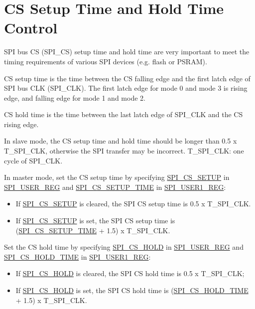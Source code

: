 \documentclass[main\_\_EN.tex]{subfiles}
\begin{document}
\section{CS Setup Time and Hold Time Control}\label{sec:spi-cs-setup-hold-time-ctrl}

SPI bus CS (SPI\_CS) setup time and hold time are very important to meet the timing requirements of various SPI devices (e.g. flash or PSRAM).

CS setup time is the time between the CS falling edge and the first latch edge of SPI bus CLK (SPI\_CLK). The first latch edge for mode 0 and mode 3 is rising edge, and falling edge for mode 1 and mode 2.

CS hold time is the time between the last latch edge of SPI\_CLK and the CS rising edge.

In slave mode, the CS setup time and hold time should be longer than 0.5 x T\_SPI\_CLK, otherwise the SPI transfer may be incorrect. T\_SPI\_CLK: one cycle of SPI\_CLK.

In master mode, set the CS setup time by specifying \hyperref[fielddesc:SPICSSETUP]{SPI\_CS\_SETUP} in \hyperref[regdesc:SPIUSERREG]{SPI\_USER\_REG} and  \hyperref[fielddesc:SPICSSETUPTIME]{SPI\_CS\_SETUP\_TIME} in \hyperref[regdesc:SPIUSER1REG]{SPI\_USER1\_REG}:
    \begin{itemize}
        \item If \hyperref[fielddesc:SPICSSETUP]{SPI\_CS\_SETUP} is cleared, the SPI CS setup time is 0.5 x T\_SPI\_CLK.
        \item If \hyperref[fielddesc:SPICSSETUP]{SPI\_CS\_SETUP} is set, the SPI CS setup time is (\hyperref[fielddesc:SPICSSETUPTIME]{SPI\_CS\_SETUP\_TIME} + 1.5) x T\_SPI\_CLK.
    \end{itemize}

Set the CS hold time by specifying \hyperref[fielddesc:SPICSHOLD]{SPI\_CS\_HOLD} in \hyperref[regdesc:SPIUSERREG]{SPI\_USER\_REG} and  \hyperref[fielddesc:SPICSHOLDTIME]{SPI\_CS\_HOLD\_TIME} in \hyperref[regdesc:SPIUSER1REG]{SPI\_USER1\_REG}:
    \begin{itemize}
        \item If \hyperref[fielddesc:SPICSHOLD]{SPI\_CS\_HOLD} is cleared, the SPI CS hold time is 0.5 x T\_SPI\_CLK;
        \item If \hyperref[fielddesc:SPICSHOLD]{SPI\_CS\_HOLD} is set, the SPI CS hold time is (\hyperref[fielddesc:SPICSHOLDTIME]{SPI\_CS\_HOLD\_TIME} + 1.5) x T\_SPI\_CLK.
    \end{itemize}
\end{document}
